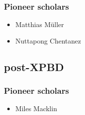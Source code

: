 \documentclass[pdflatex,sn-mathphys-num]{sn-jnl}%
\theoremstyle{thmstyleone}%
\theoremstyle{thmstyletwo}%
\theoremstyle{thmstylethree}%
\begin{document}
\subsubsection{Pioneer scholars}

\begin{itemize}
	\item Matthias Müller
	
	\item Nuttapong Chentanez
\end{itemize}

\subsection{post-XPBD}
\newpage



\subsubsection{Pioneer scholars}

\begin{itemize}
	\item Miles Macklin
\end{itemize}

\appendix
\end{document}
